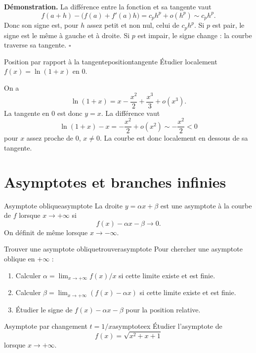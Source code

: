 \documentclass[11pt,a4paper]{article}
\begin{document}
\textbf{Démonstration.} La différence entre la fonction et sa tangente vaut
\[
  f(a+h)-\big(f(a)+f'(a)h\big)=c_p h^p+o(h^p)\sim c_p h^p.
\]
Donc son signe est, pour $h$ assez petit et non nul, celui de $c_p h^p$. Si $p$ est pair, le signe est le même à gauche et à droite. Si $p$ est impair, le signe change : la courbe traverse sa tangente.
\hfill $\square$

\begin{examplebox}{Position par rapport à la tangente}{positiontangente}
Étudier localement $f(x)=\ln(1+x)$ en $0$.
\end{examplebox}

On a
\[
  \ln(1+x)=x-\frac{x^2}{2}+\frac{x^3}{3}+o(x^3).
\]
La tangente en $0$ est donc $y=x$. La différence vaut
\[
  \ln(1+x)-x=-\frac{x^2}{2}+o(x^2)\sim-\frac{x^2}{2}<0
\]
pour $x$ assez proche de $0$, $x\ne0$. La courbe est donc localement en dessous de sa tangente.

\section{Asymptotes et branches infinies}

\begin{definitionbox}{Asymptote oblique}{asymptote}
La droite $y=\alpha x+\beta$ est une asymptote à la courbe de $f$ lorsque $x\to+\infty$ si
\[
  f(x)-\alpha x-\beta\longrightarrow0.
\]
On définit de même lorsque $x\to-\infty$.
\end{definitionbox}

\begin{methodbox}{Trouver une asymptote oblique}{trouverasymptote}
Pour chercher une asymptote oblique en $+\infty$ :
\begin{enumerate}[label=\arabic*)]
\item Calculer $\alpha=\lim_{x\to+\infty}f(x)/x$ si cette limite existe et est finie.
\item Calculer $\beta=\lim_{x\to+\infty}(f(x)-\alpha x)$ si cette limite existe et est finie.
\item Étudier le signe de $f(x)-\alpha x-\beta$ pour la position relative.
\end{enumerate}
\end{methodbox}

\begin{examplebox}{Asymptote par changement $t=1/x$}{asymptoteex}
Étudier l'asymptote de
\[
  f(x)=\sqrt{x^2+x+1}
\]
lorsque $x\to+\infty$.
\end{examplebox}
\end{document}
